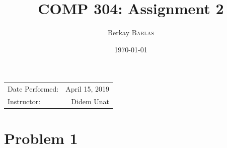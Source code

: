 \documentclass{article}
\title{COMP 304: Assignment 2} %
\author{Berkay \textsc{Barlas}} %
\date{\today} %
\begin{document}
\maketitle %

\begin{center}
\begin{tabular}{l r}
Date Performed: & April 15, 2019 \\ %
Instructor: & Didem Unat %
\end{tabular}
\end{center}




\section{Problem 1}

\subsection{}
\end{document}
